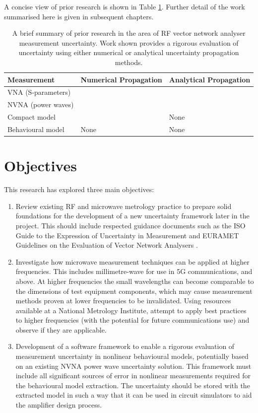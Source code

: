 \documentclass[../thesis/thesis.tex]{subfiles}
\begin{document}
\begin{refsection}
A concise view of prior research is shown in Table \ref{ch1_table_prior}. Further detail of the work summarised here is given in subsequent chapters.

\begin{table}[]
	\begin{tabular}{@{}lll@{}}
		\toprule
		Measurement        & Numerical Propagation & Analytical Propagation\\ \midrule
		VNA (S-parameters) & \cite{Hoffman_2007,VNATools}  & \cite{Lewandowski_2010B,VNATools}           \\
		NVNA (power waves) & \cite{MUFWebsite,Avolio_2015}          & \cite{Lin_2012}           \\
		Compact model      & \cite{Williams_2016,Cheron_2018}    & None           \\
		Behavioural model  & None          &  None          \\ \bottomrule
	\end{tabular}
\caption[Summary of prior research into RF vector network analyser measurement uncertainty.]{A brief summary of prior research in the area of RF vector network analyser measurement uncertainty. Work shown provides a rigorous evaluation of uncertainty using either numerical or analytical uncertainty propagation methods.}
\label{ch1_table_prior}
\end{table}

\section{Objectives}
This research has explored three main objectives:
\begin{enumerate}
	\item Review existing RF and microwave metrology practice to prepare solid foundations for the development of a new uncertainty framework later in the project. This should include respected guidance documents such as the ISO Guide to the Expression of Uncertainty in Measurement \cite{GUM_2008} and EURAMET Guidelines on the Evaluation of Vector Network Analysers \cite{EURAMET_2011}.
	\item Investigate how microwave measurement techniques can be applied at higher frequencies. This includes millimetre-wave for use in 5G communications, and above. At higher frequencies the small wavelengths can become comparable to the dimensions of test equipment components, which may cause measurement methods proven at lower frequencies to be invalidated. Using resources available at a National Metrology Institute, attempt to apply best practices to higher frequencies (with the potential for future communications use) and observe if they are applicable.
	\item Development of a software framework to enable a rigorous evaluation of measurement uncertainty in nonlinear behavioural models, potentially based on an existing NVNA power wave uncertainty solution. This framework must include all significant sources of error in nonlinear measurements required for the behavioural model extraction. The uncertainty should be stored with the extracted model in such a way that it can be used in circuit simulators to aid 
	the amplifier design process.
\end{enumerate}

\end{refsection}
\end{document}
